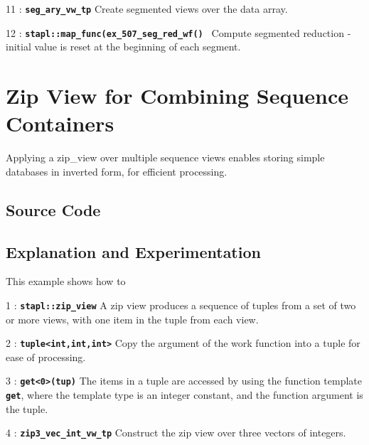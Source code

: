 \documentclass{report}
\begin{document}
\begin{hashitemize}
\item 11 : \texttt{{\bf seg\_ary\_vw\_tp}}
\newline
Create segmented views over the data array.

\item 12 : \texttt{{\bf stapl::map\_func(ex\_507\_seg\_red\_wf() }}
\newline
Compute segmented reduction - initial value is reset at the beginning of
each segment.


\end{hashitemize}


\pagebreak
\section{Zip View for Combining Sequence Containers}

Applying a zip\_view over multiple sequence views enables storing
simple databases in inverted form, for efficient processing.

\subsection{Source Code}



\subsection{Explanation and Experimentation}

This example shows how to

\begin{hashitemize}
\item 1 : \texttt{{\bf stapl::zip\_view}}
\newline
A zip view produces a sequence of tuples from a set of two or more views,
with one item in the tuple from each view.

\item 2 : \texttt{{\bf tuple<int,int,int>}}
\newline
Copy the argument of the work function into a tuple for ease of processing.

\item 3 : \texttt{{\bf get<0>(tup)}}
\newline
The items in a tuple are accessed by using the function template
\texttt{{\bf get}}, where the template type is an integer constant,
and the function argument is the tuple.

\item 4 : \texttt{{\bf zip3\_vec\_int\_vw\_tp}}
\newline
Construct the zip view over three vectors of integers.

\end{hashitemize}
\end{document}
